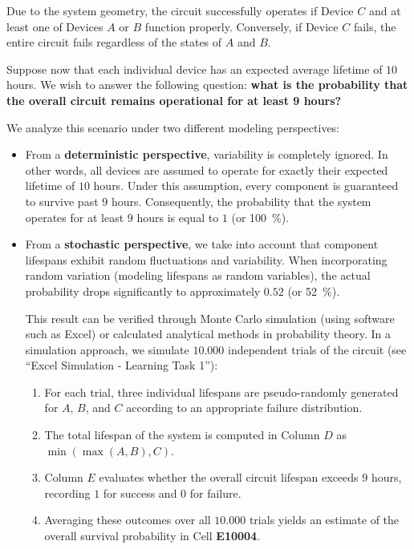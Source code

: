 \begin{example}
    Due to the system geometry, the circuit successfully operates if Device $C$ and at least one of Devices $A$ or $B$ function properly. 
    Conversely, if Device $C$ fails, the entire circuit fails regardless of the states of $A$ and $B$.\medskip

    Suppose now that each individual device has an expected average lifetime of $10$ hours.
    We wish to answer the following question: \textbf{what is the probability that the overall circuit remains operational for at least 9 hours?} \medskip

    We analyze this scenario under two different modeling perspectives:\medskip

    \begin{itemize}\setlength\itemsep{1em}
        \item From a \textbf{deterministic perspective}, variability is completely ignored.
        In other words, all devices are assumed to operate for exactly their expected lifetime of $10$ hours.
        Under this assumption, every component is guaranteed to survive past $9$ hours. 
        Consequently, the probability that the system operates for at least $9$ hours is equal to $1$ (or \SI{100}{\percent}).

        \item From a \textbf{stochastic perspective}, we take into account that component lifespans exhibit random fluctuations and variability.
        When incorporating random variation (modeling lifespans as random variables), the actual probability drops significantly to approximately $0.52$ (or \SI{52}{\percent}).\medskip

        This result can be verified through Monte Carlo simulation (using software such as Excel) or calculated analytical methods in probability theory.
        In a simulation approach, we simulate $10{.}000$ independent trials of the circuit (see \enquote{Excel Simulation - Learning Task 1}):
        
        \begin{enumerate}\setlength\itemsep{1em}
            \item For each trial, three individual lifespans are pseudo-randomly generated for $A$, $B$, and $C$ according to an appropriate failure distribution.
            \item The total lifespan of the system is computed in Column $D$ as $\min(\max(A, B), C)$.
            \item Column $E$ evaluates whether the overall circuit lifespan exceeds $9$ hours, recording $1$ for success and $0$ for failure.
            \item Averaging these outcomes over all $10{.}000$ trials yields an estimate of the overall survival probability in Cell \textbf{E10004}.
        \end{enumerate}
    \end{itemize}


\end{example}
